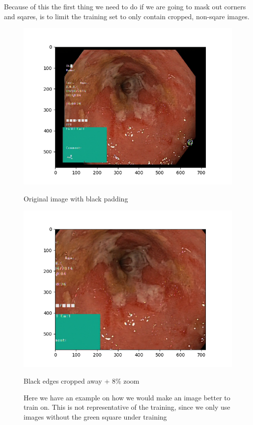     Because of this the first thing we need to do if we are going to mask out corners and sqares, is to limit the training set to only contain cropped, non-sqare images. 
 
    \begin{figure}[ht]
      \centering
      \begin{minipage}[b]{0.45\textwidth}
	\includegraphics[width=\textwidth]{background/figures/uncropped_img.png}
	\caption{Original image with black padding}
      \end{minipage}
      \hfill
      \begin{minipage}[b]{0.45\textwidth}
	\includegraphics[width=\textwidth]{background/figures/cropped_8percent_img.png}
	\caption{Black edges cropped away + 8\% zoom}
      \end{minipage}
      \caption{Here we have an example on how we would make an image better to train on. This is not representative of the training, since we only use images without the green square under training}
    \end{figure}
    
